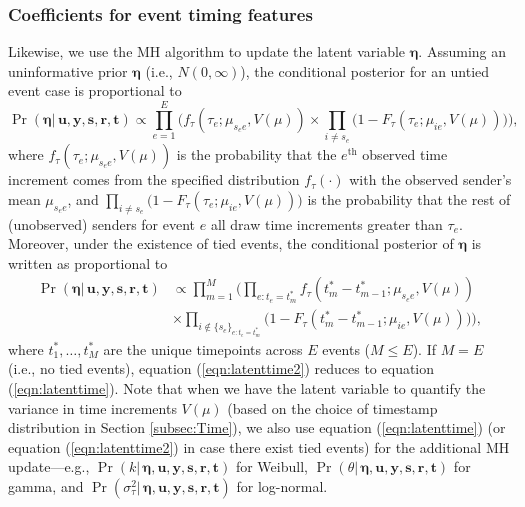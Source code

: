\documentclass[ba]{imsart}
\numberwithin{equation}{section}
\theoremstyle{plain}
\begin{document}
	\subsubsection{Coefficients for event timing features}
	Likewise, we use the MH algorithm to update the latent variable $\boldsymbol{\eta}$. Assuming an uninformative prior $\boldsymbol{\eta}$ (i.e., $N({0},\infty)$), the conditional posterior for an untied event case is proportional to~
	\begin{equation}
		\Pr(\boldsymbol{\eta}|\, \boldsymbol{u}, \boldsymbol{y},\boldsymbol{s}, \boldsymbol{r},\boldsymbol{t})\propto \prod_{e=1}^E\Big(f_{\tau}(\tau_{e}; \mu_{s_e e}, V(\mu))\times \prod_{i\neq s_e}\big(1-F_{\tau}(\tau_{e}; \mu_{ie}, V(\mu)) \big)\Big),
		\label{eqn:latenttime}
	\end{equation}
	where $f_{\tau}(\tau_{e}; \mu_{s_e e}, V(\mu))$ is the probability that the $e^{\textrm{th}}$ observed time increment comes from the specified distribution $f_\tau(\cdot)$ with the observed sender's mean $\mu_{s_e e}$, and $\prod_{i\neq s_e}\big(1-F_{\tau}(\tau_{e}; \mu_{ie},V(\mu)) \big)$ is the probability that the rest of (unobserved) senders for event $e$ all draw time increments greater than $\tau_e$. Moreover, under the existence of tied events, the conditional posterior of $\boldsymbol{\eta}$ is written as proportional to
	\begin{equation}
		\begin{aligned}
			\Pr(\boldsymbol{\eta}|\, \boldsymbol{u}, \boldsymbol{y},\boldsymbol{s}, \boldsymbol{r},\boldsymbol{t})&\propto \prod_{m=1}^M\Big(\prod_{e:t_e=t_m^*}f_{\tau}(t_m^*-t_{m-1}^*; \mu_{s_e e}, V(\mu)) \\&\times \prod_{i \notin \{s_e\}_{e:t_e=t_m^*}}\big(1-F_{\tau}(t_m^*-t_{m-1}^*; \mu_{ie}, V(\mu)) \big)\Big),
		\end{aligned}
		\label{eqn:latenttime2}
	\end{equation}
	where $t_1^*,\ldots,t_M^*$ are the unique timepoints across $E$ events ($M \leq E$). If $M=E$ (i.e., no tied events), equation (\ref{eqn:latenttime2}) reduces to equation (\ref{eqn:latenttime}). Note that when we have the latent variable to quantify the variance in time increments $V(\mu)$ (based on the choice of timestamp distribution in Section \ref{subsec:Time}), we also use equation (\ref{eqn:latenttime}) (or equation (\ref{eqn:latenttime2}) in case there exist tied events) for the additional MH update---e.g., $\Pr(k|\, \boldsymbol{\eta},\boldsymbol{u}, \boldsymbol{y},\boldsymbol{s}, \boldsymbol{r},\boldsymbol{t})$ for Weibull, $\Pr(\theta|\, \boldsymbol{\eta},\boldsymbol{u}, \boldsymbol{y},\boldsymbol{s}, \boldsymbol{r},\boldsymbol{t})$ for gamma, and  $\Pr(\sigma^2_\tau| \,\boldsymbol{\eta},\boldsymbol{u}, \boldsymbol{y},\boldsymbol{s}, \boldsymbol{r},\boldsymbol{t})$ for log-normal.~
\end{document}
